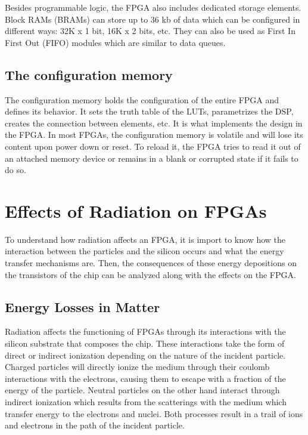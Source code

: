       Besides programmable logic, the FPGA also includes dedicated storage elements. Block RAMs (BRAMs) \cite{VIRTEX-RAM} can store up to 36 kb of data which can be configured in different ways: 32K x 1 bit, 16K x 2 bits, etc. They can also be used as First In First Out (FIFO) modules which are similar to data queues.

    \subsection{The configuration memory}

      The configuration memory holds the configuration of the entire FPGA and defines its behavior. It sets the truth table of the LUTs, parametrizes the DSP, creates the connection between elements, etc. It is what implements the design in the FPGA. In most FPGAs, the configuration memory is volatile and will lose its content upon power down or reset. To reload it, the FPGA tries to read it out of an attached memory device or remains in a blank or corrupted state if it fails to do so.

  \section{Effects of Radiation on FPGAs}

    To understand how radiation affects an FPGA, it is import to know how the interaction between the particles and the silicon occurs and what the energy transfer mechanisms are. Then, the consequences of these energy depositions on the transistors of the chip can be analyzed along with the effects on the FPGA.

    \subsection{Energy Losses in Matter}

      Radiation affects the functioning of FPGAs through its interactions with the silicon substrate that composes the chip. These interactions take the form of direct or indirect ionization depending on the nature of the incident particle. Charged particles will directly ionize the medium through their coulomb interactions with the electrons, causing them to escape with a fraction of the energy of the particle. Neutral particles on the other hand interact through indirect ionization which results from the scatterings with the medium which transfer energy to the electrons and nuclei. Both processes result in a trail of ions and electrons in the path of the incident particle. \\

